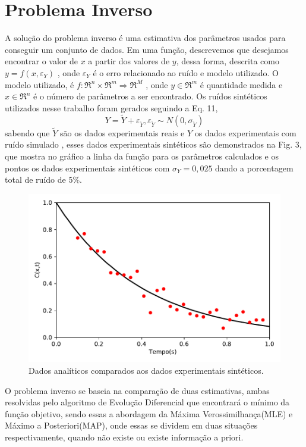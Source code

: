 \documentclass[por]{Template_SBEF}
\begin{document}
\section{Problema Inverso}
A solução do problema inverso é uma estimativa dos parâmetros usados para conseguir um conjunto de dados. Em uma função, descrevemos que desejamos encontrar o valor de $x$ a partir dos valores de $y$, dessa forma, descrita como $y = f(x, \varepsilon_Y)$ , onde $\varepsilon_Y$ é o erro relacionado ao ruído e modelo utilizado. O modelo utilizado, é $f:\mathfrak{R}^n \times \mathfrak{R}^m \Rightarrow \mathfrak{R}^M$ 
, onde $y \in \mathfrak{R}^m$ é quantidade medida e $x \in \mathfrak{R}^n$ é o número de parâmetros a ser encontrado. Os ruídos sintéticos utilizados nesse trabalho foram gerados seguindo a Eq. 11,
\begin{equation}
Y = \widetilde{Y} + \varepsilon_{\widetilde{Y}}, \varepsilon_{\widetilde{Y}} \sim N(0, \sigma_{\widetilde{Y}})
\end{equation}
sabendo que $\widetilde{Y}$ são os dados experimentais reais e $Y$ os dados experimentais com ruído simulado \cite{claudir_emmc}, esses dados experimentais sintéticos são demonstrados na Fig. 3, que mostra no gráfico a linha da função para os parâmetros calculados e os pontos os dados experimentais sintéticos com $\sigma_Y = 0,025$ dando a porcentagem total de ruído de 5\%.
\begin{figure}[H] 
	\centering
	\includegraphics[width=.8\columnwidth]{Arquivos/plot.pdf} 
	\caption{Dados analíticos comparados aos dados experimentais sintéticos.} 
\end{figure}
O problema inverso se baseia na comparação de duas estimativas,  ambas resolvidas pelo algoritmo de Evolução Diferencial que encontrará o mínimo da função objetivo, sendo essas a abordagem da Máxima Verossimilhança(MLE) e Máximo a Posteriori(MAP), onde essas se dividem em duas situações respectivamente,  quando não existe ou existe informação a priori.
\end{document}
